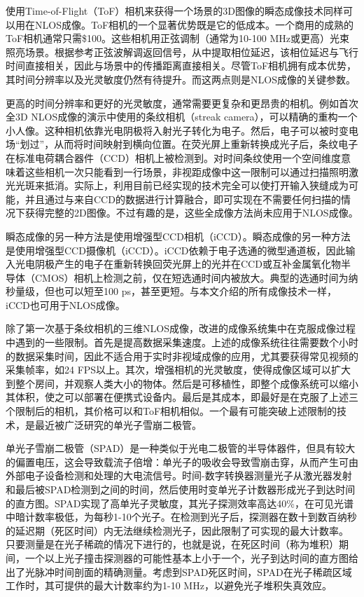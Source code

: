 \documentclass[master]{shtthesis}             %
\begin{document}
使用Time-of-Flight（ToF）相机来获得一个场景的3D图像的瞬态成像技术同样可以用在NLOS成像\citep{kadambi2013coded,kadambi2013coded,peters2015solving}。ToF相机的一个显著优势既是它的低成本。一个商用的成熟的ToF相机通常只需\$100。这些相机用正弦调制（通常为10-100 MHz或更高）光束照亮场景。根据参考正弦波解调返回信号，从中提取相位延迟，该相位延迟与飞行时间直接相关，因此与场景中的传播距离直接相关\citep{jarabo2017recent}。尽管ToF相机拥有成本优势，其时间分辨率以及光灵敏度仍然有待提升。而这两点则是NLOS成像的关键参数。

更高的时间分辨率和更好的光灵敏度，通常需要更复杂和更昂贵的相机。例如首次全3D NLOS成像的演示中使用的条纹相机（streak camera），可以精确的重构一个小人像\citep{Velten2012}。这种相机依靠光电阴极将入射光子转化为电子。然后，电子可以被时变电场“划过”，从而将时间映射到横向位置。在荧光屏上重新转换成光子后，条纹电子在标准电荷耦合器件（CCD）相机上被检测到。对时间条纹使用一个空间维度意味着这些相机一次只能看到一行场景，非视距成像中这一限制可以通过扫描照明激光光斑来抵消\citep{velten2013femto}。实际上，利用目前已经实现的技术完全可以使打开输入狭缝成为可能，并且通过与来自CCD的数据进行计算融合，即可实现在不需要任何扫描的情况下获得完整的2D图像\citep{gao2014single,mikami2016ultrafast,zhu2016space}。不过有趣的是，这些全成像方法尚未应用于NLOS成像。

瞬态成像的另一种方法是使用增强型CCD相机（iCCD）。瞬态成像的另一种方法是使用增强型CCD摄像机（iCCD）。iCCD依赖于电子选通的微型通道板，因此输入光电阴极产生的电子在重新转换回荧光屏上的光并在CCD或互补金属氧化物半导体（CMOS）相机上检测之前，仅在短选通时间内被放大。典型的选通时间为纳秒量级，但也可以短至100 ps，甚至更短。与本文介绍的所有成像技术一样，iCCD也可用于NLOS成像\citep{laurenzis2014nonline}。

除了第一次基于条纹相机的三维NLOS成像，改进的成像系统集中在克服成像过程中遇到的一些限制。首先是提高数据采集速度。上述的成像系统往往需要数个小时的数据采集时间，因此不适合用于实时非视域成像的应用，尤其要获得常见视频的采集帧率，如24 FPS以上\citep{read2000restoration}。其次，增强相机的光灵敏度，使得成像区域可以扩大到整个房间，并观察人类大小的物体。然后是可移植性，即整个成像系统可以缩小其体积，使之可以部署在便携式设备内。最后是其成本，即最好是在克服了上述三个限制后的相机，其价格可以和ToF相机相似。一个最有可能突破上述限制的技术，是最近被广泛研究的单光子雪崩二极管。

单光子雪崩二极管（SPAD）是一种类似于光电二极管的半导体器件，但具有较大的偏置电压，这会导致载流子倍增：单光子的吸收会导致雪崩击穿，从而产生可由外部电子设备检测和处理的大电流信号。时间-数字转换器测量光子从激光器发射和最后被SPAD检测到之间的时间，然后使用时变单光子计数器形成光子到达时间的直方图\citep{becker2005advanced}。SPAD实现了高单光子灵敏度，其光子探测效率高达40\%，在可见光谱中暗计数率极低，为每秒1-10个光子。在检测到光子后，探测器在数十到数百纳秒的延迟期（死区时间）内无法继续检测光子，因此限制了可实现的最大计数率。
只要测量是在光子稀疏的情况下进行的，也就是说，在死区时间（称为堆积）期间，一个以上光子撞击探测器的可能性基本上小于一个，光子到达时间的直方图给出了光脉冲时间剖面的精确测量。考虑到SPAD死区时间，SPAD在光子稀疏区域工作时，其可提供的最大计数率约为1-10 MHz，以避免光子堆积失真效应。
\end{document}
